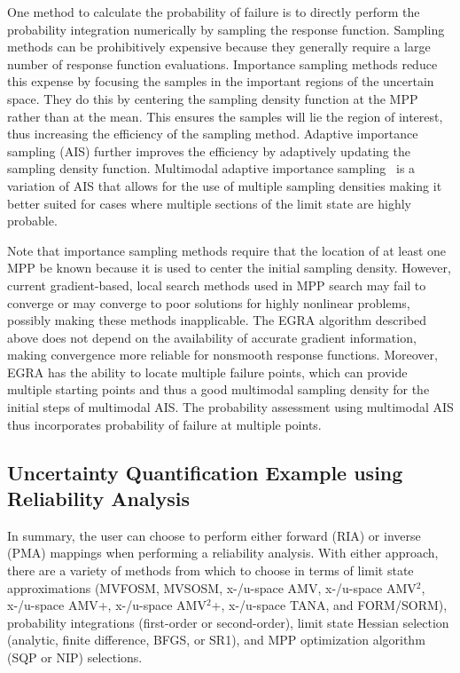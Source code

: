 One method to calculate the probability of failure is 
to directly perform the probability 
integration numerically by sampling the response function.
Sampling methods can be 
prohibitively expensive because they generally require a large 
number of response function evaluations.
Importance sampling methods reduce this expense by focusing the samples in 
the important regions of the uncertain space.
They do this by centering the sampling density function at the MPP rather
than at the mean.
This ensures the samples will lie the region of interest, 
thus increasing the efficiency of the sampling method.
Adaptive importance sampling (AIS) further improves the efficiency by 
adaptively updating the sampling density function.
Multimodal adaptive importance sampling~\cite{Dey98} is a 
variation of AIS that allows for the use of multiple sampling densities 
making it better suited for cases where multiple sections of the limit state 
are highly probable.

Note that importance sampling methods require that the location of at least 
one MPP be known because it is used to center the initial sampling density.
However, current gradient-based, local search methods used in MPP search may 
fail to converge or may converge to poor solutions for 
highly nonlinear problems, possibly making these methods inapplicable.
The EGRA algorithm described above does 
not depend on the availability of accurate gradient information, making
convergence more reliable for nonsmooth response functions.
Moreover, EGRA has the ability to locate multiple failure points, which 
can provide multiple starting points and thus a good multimodal sampling density for the initial steps of multimodal AIS.  The probability assessment 
using multimodal AIS thus incorporates probability of failure at 
multiple points.

\subsection{Uncertainty Quantification Example using Reliability Analysis} \label{uq:reliability:ex}

In summary, the user can choose to perform either forward (RIA) or
inverse (PMA) mappings when performing a reliability analysis.  With
either approach, there are a variety of methods from which to choose
in terms of limit state approximations (MVFOSM, MVSOSM, x-/u-space
AMV, x-/u-space AMV$^2$, x-/u-space AMV+, x-/u-space AMV$^2$+,
x-/u-space TANA, and FORM/SORM), probability integrations
(first-order or second-order), limit state Hessian selection
(analytic, finite difference, BFGS, or SR1), and MPP optimization
algorithm (SQP or NIP) selections.

